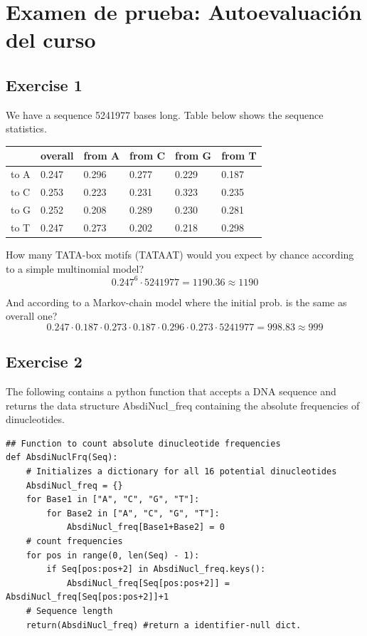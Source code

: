 \chapter{Examen de prueba: Autoevaluación del curso}
\section{Exercise 1}
We have a sequence 5241977 bases long. Table below shows the sequence statistics.

\begin{table}[htbp]
\centering
\begin{tabular}{l | l l l l l }
& overall & from A & from C & from G & from T \\ \hline
to A & 0.247 & 0.296 & 0.277 & 0.229 & 0.187 \\
to C & 0.253 & 0.223 & 0.231 & 0.323 & 0.235 \\
to G & 0.252 & 0.208 & 0.289 & 0.230 & 0.281 \\
to T & 0.247 & 0.273 & 0.202 & 0.218 & 0.298
\end{tabular}
\end{table}

How many TATA-box motifs (TATAAT) would you expect by chance according to a simple multinomial model?
$$ 0.247^6 \cdot 5241977 = 1190.36 \approx 1190 $$

And according to a Markov-chain model where the initial prob. is the same as overall one?
$$0.247 \cdot 0.187 \cdot 0.273 \cdot 0.187 \cdot 0.296 \cdot 0.273 \cdot 5241977 = 998.83 \approx 999 $$

\section{Exercise 2}
The following contains a python function that accepts a DNA sequence and returns the data structure AbsdiNucl\_freq containing the absolute frequencies of dinucleotides. 

\begin{lstlisting}
## Function to count absolute dinucleotide frequencies
def AbsdiNuclFrq(Seq):
	# Initializes a dictionary for all 16 potential dinucleotides
	AbsdiNucl_freq = {}
	for Base1 in ["A", "C", "G", "T"]:
		for Base2 in ["A", "C", "G", "T"]:
			AbsdiNucl_freq[Base1+Base2] = 0
	# count frequencies
	for pos in range(0, len(Seq) - 1):
		if Seq[pos:pos+2] in AbsdiNucl_freq.keys():
			AbsdiNucl_freq[Seq[pos:pos+2]] = AbsdiNucl_freq[Seq[pos:pos+2]]+1
	# Sequence length
	return(AbsdiNucl_freq) #return a identifier-null dict.
\end{lstlisting}

